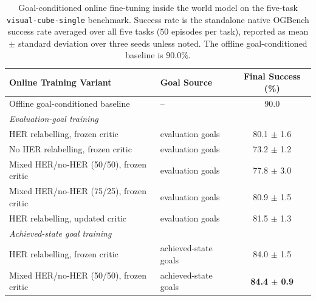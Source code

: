 \begin{table}[h]
\centering
\caption{Goal-conditioned online fine-tuning inside the world model on
the five-task \texttt{visual-cube-single} benchmark. Success rate is
the standalone native OGBench success rate averaged over all five tasks
($50$ episodes per task), reported as mean $\pm$ standard deviation over
three seeds unless noted. The offline goal-conditioned baseline is
$90.0\%$.}
\label{tab:mpc-online-e3}
\begin{tabular}{llc}
\toprule
Online Training Variant & Goal Source & Final Success (\%) \\
\midrule
Offline goal-conditioned baseline & -- & 90.0 \\
\midrule
\multicolumn{3}{l}{\emph{Evaluation-goal training}} \\
HER relabelling, frozen critic & evaluation goals & 80.1 $\pm$ 1.6 \\
No HER relabelling, frozen critic & evaluation goals & 73.2 $\pm$ 1.2 \\
Mixed HER/no-HER (50/50), frozen critic & evaluation goals & 77.8 $\pm$ 3.0 \\
Mixed HER/no-HER (75/25), frozen critic & evaluation goals & 80.9 $\pm$ 1.5 \\
HER relabelling, updated critic & evaluation goals & 81.5 $\pm$ 1.3 \\
\midrule
\multicolumn{3}{l}{\emph{Achieved-state goal training}} \\
HER relabelling, frozen critic & achieved-state goals & 84.0 $\pm$ 1.5 \\
Mixed HER/no-HER (50/50), frozen critic & achieved-state goals & \textbf{84.4 $\pm$ 0.9} \\
\bottomrule
\end{tabular}
\end{table}

